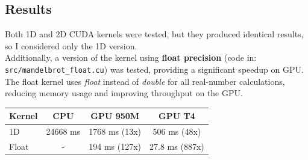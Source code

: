 \subsection{Results}
Both 1D and 2D CUDA kernels were tested, but they produced identical results, so I considered only the 1D version.\\

\noindent
Additionally, a version of the kernel using \textbf{float precision} (code in: \texttt{src/mandelbrot\_float.cu}) was tested, providing a significant speedup on GPU. The float kernel uses \textit{float} instead of \textit{double} for all real-number calculations, reducing memory usage and improving throughput on the GPU.

\begin{table}[h!]
\centering
\begin{tabular}{lccc}
\hline
\textbf{Kernel} & \textbf{CPU} & \textbf{GPU 950M} & \textbf{GPU T4} \\
\hline
1D        & 24668 ms & 1768 ms (13x) & 506 ms (48x) \\
Float     & -        & 194 ms (127x) & 27.8 ms (887x) \\
\hline
\end{tabular}
\end{table}
